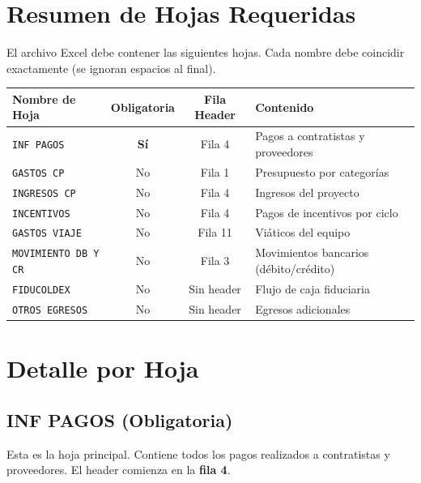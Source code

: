 \documentclass[11pt,a4paper]{article}
\begin{document}
\section{Resumen de Hojas Requeridas}

El archivo Excel debe contener las siguientes hojas. Cada nombre debe coincidir exactamente (se ignoran espacios al final).

\begin{center}
\renewcommand{\arraystretch}{1.4}
\begin{tabular}{|l|c|c|l|}
\hline
\rowcolor{verde!15}
\textbf{Nombre de Hoja} & \textbf{Obligatoria} & \textbf{Fila Header} & \textbf{Contenido} \\
\hline
\texttt{INF PAGOS} & \textcolor{rojo}{\textbf{Sí}} & Fila 4 & Pagos a contratistas y proveedores \\
\hline
\texttt{GASTOS CP} & No & Fila 1 & Presupuesto por categorías \\
\hline
\texttt{INGRESOS CP} & No & Fila 4 & Ingresos del proyecto \\
\hline
\texttt{INCENTIVOS} & No & Fila 4 & Pagos de incentivos por ciclo \\
\hline
\texttt{GASTOS VIAJE} & No & Fila 11 & Viáticos del equipo \\
\hline
\texttt{MOVIMIENTO DB Y CR} & No & Fila 3 & Movimientos bancarios (débito/crédito) \\
\hline
\texttt{FIDUCOLDEX} & No & Sin header & Flujo de caja fiduciaria \\
\hline
\texttt{OTROS EGRESOS} & No & Sin header & Egresos adicionales \\
\hline
\end{tabular}
\end{center}

\section{Detalle por Hoja}

\subsection{INF PAGOS \textcolor{rojo}{(Obligatoria)}}

Esta es la hoja principal. Contiene todos los pagos realizados a contratistas y proveedores. El header comienza en la \textbf{fila 4}.
\end{document}
